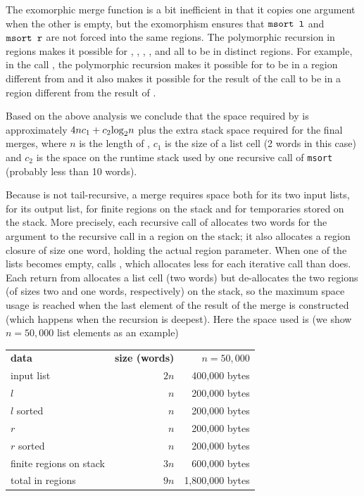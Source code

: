 \documentclass[12pt]{book}
\begin{document}
The exomorphic merge function is a bit inefficient in that it copies
one argument when the other is empty, but the exomorphism ensures that
$\hbox{\tt msort l}$ and $\hbox{\tt msort r}$ are not forced into the same
regions. The polymorphic recursion in regions makes it possible for
, , , , and 
all to be in distinct regions. For example, in the call , the polymorphic recursion makes it possible for  to be
in a region different from  and it also makes it possible for
the result of the call to be in a region different from the result of
.

Based on the above analysis we conclude that the space required by
 is approximately $4nc_1+c_2{\rm log}_2n$ plus the extra
stack space required for the final merges, where $n$ is 
the length of , $c_1$ is the size of a list cell (2 words in this
case) and $c_2$ is the space on the runtime stack used by one recursive call
of {\tt msort} (probably less than 10 words). 

Because  is not tail-recursive, 
a merge requires space both for
its two input lists, for its output list, 
for finite regions on the stack and for
temporaries stored on the stack.  More precisely,
each recursive call of  allocates two words
for the argument to the recursive call in a region on the stack;
it also allocates a region closure of size one word, holding
the actual region parameter. When one of the lists becomes empty,
 calls , which allocates less for each 
iterative call than  does. Each return from 
 allocates a list cell (two words) but de-allocates
the two regions (of sizes two and one words, respectively) 
on the stack, so
the maximum space usage is reached when the last element of the
result of the merge is constructed (which happens when the recursion 
is deepest). Here the space used is (we show $n = 50,000$ list elements
as an example)
\begin{center}
\begin{tabular}{lrr}
{\bf data} & {\bf size (words)} &$n=50,000$\\
input list& $2n$ & 400,000 bytes\\
$l$ & $n$ & 200,000 bytes\\
$l$ sorted & $n$ & 200,000 bytes\\
$r$ & $n$ & 200,000 bytes\\
$r$ sorted & $n$ & 200,000 bytes\\
finite regions on stack & $3n$ & 600,000 bytes\\ \hline
total in regions& $9n$ & 1,800,000 bytes
\end{tabular}
\end{center}
\end{document}
